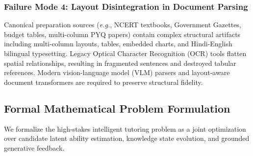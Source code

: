 \documentclass[conference]{IEEEtran}
\begin{document}
\subsubsection{Failure Mode 4: Layout Disintegration in Document Parsing}
Canonical preparation sources (\textit{e.g.}, NCERT textbooks, Government Gazettes, budget tables, multi-column PYQ papers) contain complex structural artifacts including multi-column layouts, tables, embedded charts, and Hindi-English bilingual typesetting. Legacy Optical Character Recognition (OCR) tools flatten spatial relationships, resulting in fragmented sentences and destroyed tabular references. Modern vision-language model (VLM) parsers and layout-aware document transformers \cite{Kim2022,Wang2024,Zhang2024,Abramovich2024,Poznanski2025} are required to preserve structural fidelity.

\subsection{Formal Mathematical Problem Formulation}
We formalize the high-stakes intelligent tutoring problem as a joint optimization over candidate latent ability estimation, knowledge state evolution, and grounded generative feedback.
\end{document}
